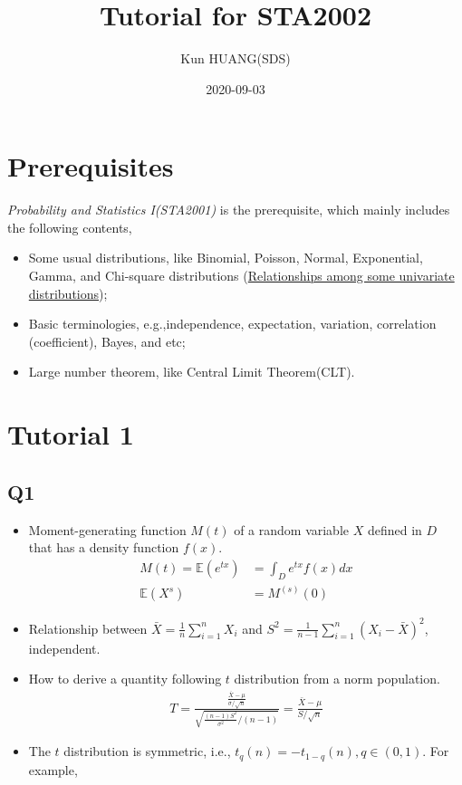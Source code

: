\documentclass[
]{book}
\title{Tutorial for STA2002}
\author{Kun HUANG(SDS)}
\date{2020-09-03}
\theoremstyle{definition}
\theoremstyle{definition}
\theoremstyle{definition}
\theoremstyle{remark}
\begin{document}
\maketitle

{
\setcounter{tocdepth}{1}
\tableofcontents
}
\hypertarget{prerequisites}{%
\chapter{Prerequisites}\label{prerequisites}}

\emph{Probability and Statistics I(STA2001)} is the prerequisite, which mainly includes the following contents,

\begin{itemize}
\item
  Some usual distributions, like Binomial, Poisson, Normal, Exponential, Gamma, and Chi-square distributions (\href{https://www.tandfonline.com/doi/pdf/10.1080/07408170590948512?needAccess=true}{Relationships among some univariate
  distributions}\citep{song2005relationships});
\item
  Basic terminologies, e.g.,independence, expectation, variation, correlation (coefficient), Bayes, and etc;
\item
  Large number theorem, like Central Limit Theorem(CLT).
\end{itemize}

\hypertarget{sec:T1}{%
\chapter{Tutorial 1}\label{sec:T1}}

\hypertarget{q1}{%
\section{Q1}\label{q1}}

\begin{itemize}
\item
  Moment-generating function \(M(t)\) of a random variable \(X\) defined in \(D\) that has a density function \(f(x)\).
  \begin{align}
  M(t) = \mathbb{E}(e^{tx}) &= \int_{D} e^{tx}f(x)dx\\
  \mathbb{E}(X^{s}) &= M^{(s)}(0)
  \end{align}
\item
  Relationship between \(\bar X=\frac{1}{n}\sum\limits_{i=1}^n X_i\) and \(S^2=\frac{1}{n-1}\sum\limits_{i=1}^n(X_i-\bar X)^2\), independent.
\item
  How to derive a quantity following \(t\) distribution from a norm population.
  \begin{align}
  T=\frac{\frac{\bar{X}-\mu}{\sigma / \sqrt{n}}}{\sqrt{\frac{(n-1) S^{2}}{\sigma^{2}} /(n-1)}}=\frac{\bar{X}-\mu}{S / \sqrt{n}}
  \end{align}
\item
  The \(t\) distribution is symmetric, i.e., \(t_{q}(n) = -t_{1-q}(n), q\in(0,1)\). For example,
\end{itemize}
\end{document}
